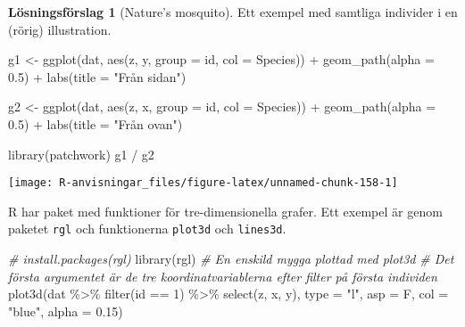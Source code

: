 \documentclass[
]{book}
\newenvironment{Shaded}{\begin{snugshade}}{\end{snugshade}}
\newcommand{\AttributeTok}[1]{\textcolor[rgb]{0.77,0.63,0.00}{#1}}
\newcommand{\CommentTok}[1]{\textcolor[rgb]{0.56,0.35,0.01}{\textit{#1}}}
\newcommand{\DecValTok}[1]{\textcolor[rgb]{0.00,0.00,0.81}{#1}}
\newcommand{\FloatTok}[1]{\textcolor[rgb]{0.00,0.00,0.81}{#1}}
\newcommand{\FunctionTok}[1]{\textcolor[rgb]{0.00,0.00,0.00}{#1}}
\newcommand{\NormalTok}[1]{#1}
\newcommand{\OtherTok}[1]{\textcolor[rgb]{0.56,0.35,0.01}{#1}}
\newcommand{\SpecialCharTok}[1]{\textcolor[rgb]{0.00,0.00,0.00}{#1}}
\newcommand{\StringTok}[1]{\textcolor[rgb]{0.31,0.60,0.02}{#1}}
\theoremstyle{definition}
\theoremstyle{definition}
\theoremstyle{definition}
\theoremstyle{definition}
\newtheorem{hypothesis}{Lösningsförslag}[chapter]
\theoremstyle{remark}
\begin{document}
\begin{hypothesis}[Nature's mosquito]
Ett exempel med samtliga individer i en (rörig) illustration.

\begin{Shaded}
\begin{Highlighting}[]
\NormalTok{g1 }\OtherTok{\textless{}{-}} \FunctionTok{ggplot}\NormalTok{(dat, }\FunctionTok{aes}\NormalTok{(z, y, }\AttributeTok{group =}\NormalTok{ id, }\AttributeTok{col =}\NormalTok{ Species)) }\SpecialCharTok{+} 
  \FunctionTok{geom\_path}\NormalTok{(}\AttributeTok{alpha =} \FloatTok{0.5}\NormalTok{) }\SpecialCharTok{+}
  \FunctionTok{labs}\NormalTok{(}\AttributeTok{title =} \StringTok{"Från sidan"}\NormalTok{)}

\NormalTok{g2 }\OtherTok{\textless{}{-}} \FunctionTok{ggplot}\NormalTok{(dat, }\FunctionTok{aes}\NormalTok{(z, x, }\AttributeTok{group =}\NormalTok{ id, }\AttributeTok{col =}\NormalTok{ Species)) }\SpecialCharTok{+} 
  \FunctionTok{geom\_path}\NormalTok{(}\AttributeTok{alpha =} \FloatTok{0.5}\NormalTok{) }\SpecialCharTok{+}
  \FunctionTok{labs}\NormalTok{(}\AttributeTok{title =} \StringTok{"Från ovan"}\NormalTok{)}

\FunctionTok{library}\NormalTok{(patchwork)}
\NormalTok{g1 }\SpecialCharTok{/}\NormalTok{ g2}
\end{Highlighting}
\end{Shaded}

\begin{center}\texttt{[image: R-anvisningar\_files/figure-latex/unnamed-chunk-158-1]} \end{center}

R har paket med funktioner för tre-dimensionella grafer. Ett exempel är genom paketet \texttt{rgl} och funktionerna \texttt{plot3d} och \texttt{lines3d}.

\begin{Shaded}
\begin{Highlighting}[]
\CommentTok{\# install.packages(rgl)}
\FunctionTok{library}\NormalTok{(rgl)}
\CommentTok{\# En enskild mygga plottad med plot3d}
\CommentTok{\# Det första argumentet är de tre koordinatvariablerna efter filter på första individen}
\FunctionTok{plot3d}\NormalTok{(dat }\SpecialCharTok{\%\textgreater{}\%} \FunctionTok{filter}\NormalTok{(id }\SpecialCharTok{==} \DecValTok{1}\NormalTok{) }\SpecialCharTok{\%\textgreater{}\%} \FunctionTok{select}\NormalTok{(z, x, y), }\AttributeTok{type =} \StringTok{"l"}\NormalTok{, }\AttributeTok{asp =}\NormalTok{ F, }\AttributeTok{col =} \StringTok{"blue"}\NormalTok{, }\AttributeTok{alpha =} \FloatTok{0.15}\NormalTok{)}


\end{Highlighting}
\end{Shaded}
\end{hypothesis}
\end{document}
